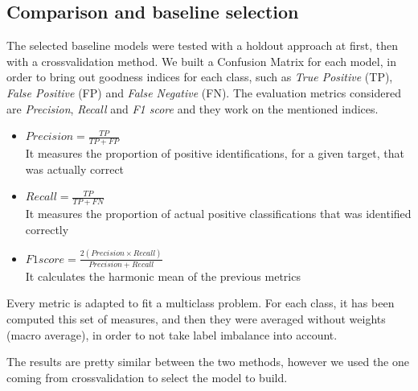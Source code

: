 \subsection{Comparison and baseline selection}
The selected baseline models were tested with a holdout approach at first, then with a crossvalidation method.
We built a Confusion Matrix for each model, in order to bring out goodness indices for each class, such as \textit{True Positive} (TP), \textit{False Positive} (FP) and \textit{False Negative} (FN).
The evaluation metrics considered are \textit{Precision}, \textit{Recall} and \textit{F1 score} and they work on the mentioned indices.
\begin{itemize}
	\item[\PencilRight] $ Precision = \frac{TP}{TP+FP} $\\
	It measures the proportion of positive identifications, for a given target, that was actually correct
	\item[\PencilRight] $ Recall = \frac{TP}{TP+FN} $\\
	It measures the proportion of actual positive classifications that was identified correctly
	\item[\PencilRight] $ F1 score = \frac{2(Precision \times Recall )}{Precision+Recall} $\\
	It calculates the harmonic mean of the previous metrics
\end{itemize}
Every metric is adapted to fit a multiclass problem. For each class, it has been computed this set of measures, and then they were averaged without weights (macro average), in order to not take label imbalance into account.

The results are pretty similar between the two methods, however we used the one coming from crossvalidation to select the model to build.
